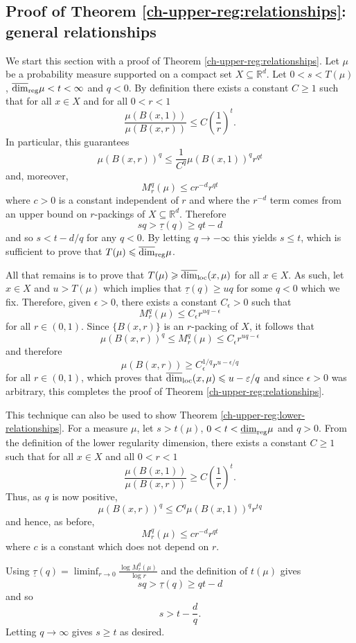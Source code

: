 \subsection{Proof of Theorem \ref{ch-upper-reg:relationships}: general relationships}\label{ch-upper-reg:spectrumproof}

We start this section with a proof of Theorem \ref{ch-upper-reg:relationships}. Let $\mu$ be a probability measure supported on a compact set $X \subseteq \mathbb{R}^d$. Let $0<s< T(\mu)$,  $\overline{\dim}_{\textup{reg}} \mu < t < \infty$ and $q<0$. By definition there exists a  constant  $C \geq 1$ such that for all $x\in X$ and for all $0<r< 1$
\[
\frac{\mu(B(x,1))}{\mu(B(x,r))} \le C \left(\frac{1}{r} \right)^t.
\]
In particular, this guarantees 
\[
\mu(B(x,r))^q \le \frac{1}{C^q}\mu(B(x,1))^q  r^{qt}
\]
and, moreover, 
\[
M_r^q(\mu) \leq c r^{-d}r^{qt}
\]
where $c>0$ is a constant independent of  $r$ and where the $r^{-d}$ term comes from an upper bound on $r$-packings of $X \subseteq \mathbb{R}^d$.  Therefore 
\[
sq > \underline{\tau}(q)   \ge  qt-d
\]
and so $s<t-d/q$ for any $q<0$. By letting $q \rightarrow - \infty$ this yields $s \le t$, which is sufficient to prove that $T(\mu) \leqslant \overline{\dim}_{\textup{reg}} \mu$.

All that remains is to prove that $T(\mu) \geqslant \overline{\dim}_{\textup{loc}}(x,\mu)$ for all $x \in X$.  As such, let $x \in X$ and $u>T(\mu)$ which implies that $\underline{\tau}(q)  \geq  uq$ for some $q<0$ which we fix.  Therefore, given $\epsilon>0$, there exists a constant $C_\epsilon>0$ such that
\[
M_r^q(\mu) \leq C_\epsilon r^{uq-\epsilon}
\]
for all $r \in (0,1)$.  Since $\{ B(x,r)\}$ is an $r$-packing of $X$, it follows that
\[
\mu(B(x,r))^q \le M_r^q(\mu) \leq C_\epsilon r^{uq-\epsilon}
\]
and therefore
\[
\mu(B(x,r)) \ge  C_\epsilon^{1/q} r^{u-\epsilon/q}
\]
for all $r\in (0,1)$, which proves that $\overline{\dim}_{\textup{loc}}(x,\mu) \leqslant u-\varepsilon/q$ and since $\epsilon>0$ was arbitrary, this completes the proof of Theorem \ref{ch-upper-reg:relationships}.

This technique can also be used to show Theorem \ref{ch-upper-reg:lower-relationships}. For a measure $\mu$, let $s > t(\mu)$, $0 < t < \underline{\dim}_{\textup{reg}} \mu$ and $q > 0$. From the definition of the lower regularity dimension, there exists a constant $C \ge 1$ such that for all $x\in X$ and all $0<r<1$
\[
\frac{\mu(B(x,1))}{\mu(B(x,r))} \ge C \left( \frac{1}{r}\right)^t.
\]
Thus, as $q$ is now positive,
\[
\mu(B(x,r))^q \le C^q \mu(B(x,1))^q r^{tq}
\]
and hence, as before,
\[
M_r^q(\mu) \le cr^{-d}r^{qt}
\]
where $c$ is a constant which does not depend on $r$.

Using $\underline{\tau}(q) = \liminf_{r \rightarrow 0} \frac{\log M_r^q(\mu)}{\log r}$ and the definition of $t(\mu)$ gives
\[
sq > \underline{\tau}(q) \ge qt - d
\]
and so
\[
s> t-\frac{d}{q}.
\]
Letting $q \rightarrow \infty$ gives $s \ge t$ as desired.

